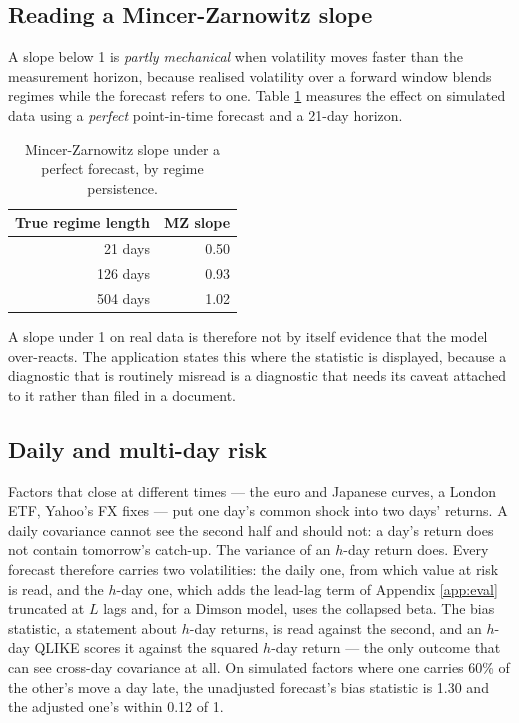 \documentclass[11pt,a4paper]{article}
\begin{document}
\subsection{Reading a Mincer-Zarnowitz slope}

A slope below 1 is \emph{partly mechanical} when volatility moves faster than the
measurement horizon, because realised volatility over a forward window blends regimes
while the forecast refers to one. Table \ref{tab:mz} measures the effect on simulated
data using a \emph{perfect} point-in-time forecast and a 21-day horizon.

\begin{table}[htbp]
\centering
\caption{Mincer-Zarnowitz slope under a perfect forecast, by regime persistence.}
\label{tab:mz}
\small
\begin{tabular}{@{}rr@{}}
\toprule
\textbf{True regime length} & \textbf{MZ slope} \\
\midrule
21 days  & 0.50 \\
126 days & 0.93 \\
504 days & 1.02 \\
\bottomrule
\end{tabular}
\end{table}

A slope under 1 on real data is therefore not by itself evidence that the model
over-reacts. The application states this where the statistic is displayed, because a
diagnostic that is routinely misread is a diagnostic that needs its caveat attached
to it rather than filed in a document.

\subsection{Daily and multi-day risk}
\label{sec:leadlag}

Factors that close at different times --- the euro and Japanese curves, a London
ETF, Yahoo's FX fixes --- put one day's common shock into two days' returns. A
daily covariance cannot see the second half and should not: a day's return does not
contain tomorrow's catch-up. The variance of an $h$-day return does. Every forecast
therefore carries two volatilities: the daily one, from which value at risk is
read, and the $h$-day one, which adds the lead-lag term of Appendix
\ref{app:eval} truncated at $L$ lags and, for a Dimson model, uses the collapsed
beta. The bias statistic, a statement about $h$-day returns, is read against the
second, and an $h$-day QLIKE scores it against the squared $h$-day return --- the
only outcome that can see cross-day covariance at all. On simulated factors where
one carries 60\% of the other's move a day late, the unadjusted forecast's bias
statistic is 1.30 and the adjusted one's within 0.12 of 1.
\end{document}
